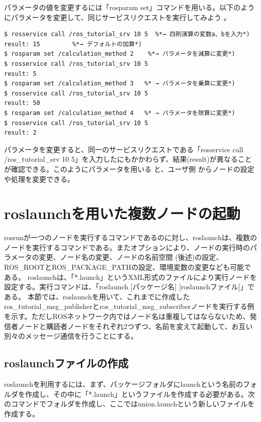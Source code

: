 パラメータの値を変更するには「rosparam set」コマンドを用いる。以下のようにパラメータを変更して、同じサービスリクエストを実行してみよう  。

\begin{lstlisting}[language=ROS]
$ rosservice call /ros_tutorial_srv 10 5  %*→ 四則演算の変数a、bを入力*)
result: 15         %*→ デフォルトの加算*)
$ rosparam set /calculation_method 2    %*→ パラメータを減算に変更*)
$ rosservice call /ros_tutorial_srv 10 5
result: 5
$ rosparam set /calculation_method 3   %* → パラメータを乗算に変更*)
$ rosservice call /ros_tutorial_srv 10 5
result: 50
$ rosparam set /calculation_method 4   %* → パラメータを除算に変更*)
$ rosservice call /ros_tutorial_srv 10 5
result: 2
\end{lstlisting}

パラメータを変更すると、同一のサービスリクエストである「rosservice call /ros\_tutorial\_srv 10 5」を入力したにもかかわらず、結果(result)が異なることが確認できる。このようにパラメータを用いる  と、ユーザ側 からノードの設定や処理を変更できる。

\section{roslaunchを用いた複数ノードの起動}

rosrunが一つのノードを実行するコマンドであるのに対し、roslaunchは、複数のノードを実行するコマンドである。またオプションにより、ノードの実行時のパラメータの変更、ノード名の変更、ノードの名前空間  (後述)の設定、ROS\_ROOTとROS\_PACKAGE\_PATHの設定、環境変数の変更なども可能である。
roslaunchは、「*.launch」というXML形式のファイルにより実行ノードを設定する。実行コマンドは、「roslaunch [パッケージ名] [roslaunchファイル]」である。
本節では、roslaunchを用いて、これまでに作成したros\_tutorial\_msg\_publisherとros\_tutorial\_msg\_subscriberノードを実行する例を示す。ただしROSネットワーク内ではノード名は重複してはならないため、発信者ノードと購読者ノードをそれぞれ2つずつ、名前を変えて起動して、お互い別々のメッセージ通信を行うことにする。

\subsection{roslaunchファイルの作成}

 roslaunchを利用するには、まず、パッケージフォルダにlaunchという名前のフォルダを作成し、その中に「*.launch」というファイルを作成する必要がある。次のコマンドでフォルダを作成し、ここではunion.launchという新しいファイルを作成する。

